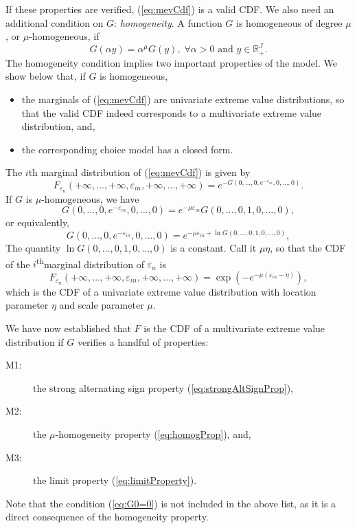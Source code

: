 \documentclass[12pt,a4paper]{article}
\newcommand{\req}[1]{(\ref{#1})}
\newcommand{\R}{\mathbb{R}}
\renewcommand{\th}{\textsuperscript{th}}
\begin{document}
If these properties are verified, \req{eq:mevCdf} is a valid CDF. 
We also need an additional condition on $G$: \emph{homogeneity}. A function $G$ is homogeneous
of degree $\mu$, or $\mu$-homogeneous, if
\begin{equation}
\label{eq:homogProp}
G(\alpha y) = \alpha^\mu G(y), \;\forall \alpha > 0 \text{ and } y\in \R_+^{J}.
\end{equation}
The homogeneity condition   implies two important properties of the model. We show below that, if $G$ is homogeneous, 
\begin{itemize}
\item the marginals of \req{eq:mevCdf} are univariate extreme value distributions, so that the valid CDF indeed corresponds to a multivariate extreme value distribution, and,
\item the corresponding choice model has a closed form.
\end{itemize}
The $i$th marginal
distribution of \req{eq:mevCdf} is given by
\begin{equation}
F_{\varepsilon_n}(+\infty,\ldots,+\infty,\varepsilon_{in},+\infty,\ldots,+\infty) =
e^{-G(0,\ldots,0,e^{-\varepsilon_{in}},0,\ldots,0)}.
\end{equation}
If $G$ is $\mu$-homogeneous, we have
\[
G(0,\ldots,0,e^{-\varepsilon_{in}},0,\ldots,0) = e^{-\mu\varepsilon_{in}}G(0,\ldots,0,1,0,\ldots,0),
\]
or equivalently,
\[
G(0,\ldots,0,e^{-\varepsilon_{in}},0,\ldots,0) = e^{-\mu\varepsilon_{in} + \ln G(0,\ldots,0,1,0,\ldots,0)},
\]
The quantity $\ln G(0,\ldots,0,1,0,\ldots,0)$ is a constant. Call it
$\mu \eta$, so that
the CDF of the $i$\th marginal
distribution of $\varepsilon_n$ is
\begin{equation}
F_{\varepsilon_n}(+\infty,\ldots,+\infty,\varepsilon_{in},+\infty,\ldots,+\infty)
=\exp\left(-e^{-\mu(\varepsilon_{in}-\eta)}\right),
\end{equation}
which is the CDF of a univariate extreme value distribution with
location parameter $\eta$ and scale parameter $\mu$.

We have now established that $F$ is the CDF of a multivariate extreme
value distribution if $G$ verifies a handful of properties:
\begin{description}
\item[M1:] the strong alternating sign property \req{eq:strongAltSignProp}, 
\item[M2:] the $\mu$-homogeneity property \req{eq:homogProp}, and,
\item[M3:] the limit property \req{eq:limitProperty}.
\end{description}
Note that the condition \req{eq:G0=0} is not included in the above list, as it is a direct consequence of the
homogeneity property. 
\end{document}
